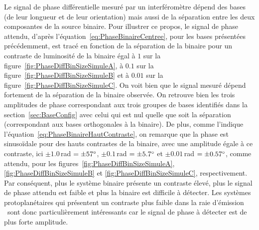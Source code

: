 Le signal de phase différentielle mesuré par un interféromètre dépend des bases (de leur longueur et de leur orientation) mais aussi de la séparation entre les deux composantes de la source binaire. Pour illustrer ce propos, le signal de phase attendu, d'après l'équation~\ref{eq:PhaseBinaireCentree}, pour les bases présentées précédemment, est tracé en fonction de la séparation de la binaire pour un contraste de luminosité de la binaire égal à $1$ sur la figure~\ref{fig:PhaseDiffBinSizeSimuleA}, à $0.1$ sur la figure~\ref{fig:PhaseDiffBinSizeSimuleB} et à $0.01$ sur la figure~\ref{fig:PhaseDiffBinSizeSimuleC}. On voit bien que le signal mesuré dépend fortement de la séparation de la binaire observée. On retrouve bien les trois amplitudes de phase correspondant aux trois groupes de bases identifiés dans la section~\ref{sec:BaseConfig} avec celui qui est nul quelle que soit la séparation (correspondant aux bases orthogonales à la binaire). De plus, comme l'indique l'équation~\ref{eq:PhaseBinaireHautContraste}, on remarque que la phase est sinusoïdale pour des hauts contrastes de la binaire, avec une amplitude égale à ce contraste, ici $\pm 1.0 \,$rad $ = \pm 57^{\circ}$, $\pm 0.1 \,$rad $ = \pm 5.7^{\circ}$ et $\pm 0.01 \,$rad $ = \pm 0.57^{\circ}$, comme attendu, pour les figures~\ref{fig:PhaseDiffBinSizeSimuleA}, \ref{fig:PhaseDiffBinSizeSimuleB} et \ref{fig:PhaseDiffBinSizeSimuleC}, respectivement. Par conséquent, plus le système binaire présente un contraste élevé, plus le signal de phase attendu est faible et plus la binaire est difficile à détecter. Les systèmes protoplanétaires qui présentent un contraste plus faible dans la raie d'émission \ha~sont donc particulièrement intéressants car le signal de phase à détecter est de plus forte amplitude.

